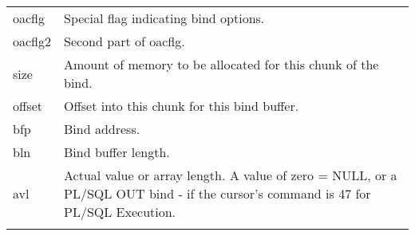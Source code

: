 \begin{longtable}[]{@{}l|l@{}}
\begin{minipage}[t]{0.14\columnwidth}
oacflg\strut
\end{minipage} & \begin{minipage}[t]{0.65\columnwidth}\raggedright\strut
Special flag indicating bind options.\strut
\end{minipage}\tabularnewline
\begin{minipage}[t]{0.14\columnwidth}\raggedright\strut
oacflg2\strut
\end{minipage} & \begin{minipage}[t]{0.65\columnwidth}\raggedright\strut
Second part of oacflg.\strut
\end{minipage}\tabularnewline
\begin{minipage}[t]{0.14\columnwidth}\raggedright\strut
size\strut
\end{minipage} & \begin{minipage}[t]{0.65\columnwidth}\raggedright\strut
Amount of memory to be allocated for this chunk of the bind.\strut
\end{minipage}\tabularnewline
\begin{minipage}[t]{0.14\columnwidth}\raggedright\strut
offset\strut
\end{minipage} & \begin{minipage}[t]{0.65\columnwidth}\raggedright\strut
Offset into this chunk for this bind buffer.\strut
\end{minipage}\tabularnewline
\begin{minipage}[t]{0.14\columnwidth}\raggedright\strut
bfp\strut
\end{minipage} & \begin{minipage}[t]{0.65\columnwidth}\raggedright\strut
Bind address.\strut
\end{minipage}\tabularnewline
\begin{minipage}[t]{0.14\columnwidth}\raggedright\strut
bln\strut
\end{minipage} & \begin{minipage}[t]{0.65\columnwidth}\raggedright\strut
Bind buffer length.\strut
\end{minipage}\tabularnewline
\begin{minipage}[t]{0.14\columnwidth}\raggedright\strut
avl\strut
\end{minipage} & \begin{minipage}[t]{0.65\columnwidth}\raggedright\strut
Actual value or array length. A value of zero = NULL, or a PL/SQL OUT bind - if
the cursor's command is 47 for PL/SQL Execution.\strut
\end{minipage}\tabularnewline
\begin{minipage}[t]{0.14\columnwidth}\raggedright\strut

\end{minipage}
\end{longtable}
